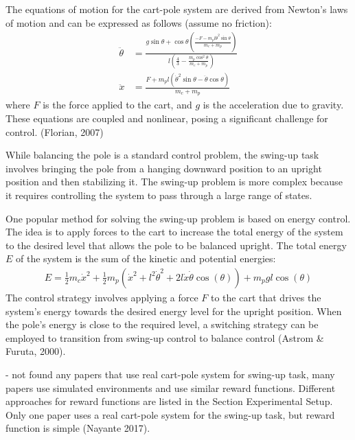The equations of motion for the cart-pole system are derived from Newton's laws of motion and can be expressed as follows (assume no friction):
\begin{align}
    \ddot{\theta} &= \frac{g\sin\theta + \cos\theta\left(\frac{-F-m_pl\dot{\theta}^2\sin\theta}{m_c+m_p}\right)}{l\left(\frac{4}{3}-\frac{m_p\cos^2\theta}{m_c+m_p}\right)} \\
    \ddot{x} &= \frac{F+m_pl(\dot{\theta}^2\sin\theta-\ddot{\theta}\cos\theta)}{m_c+m_p}
\end{align}
where $F$ is the force applied to the cart, and $g$ is the acceleration due to gravity. These equations are coupled and nonlinear, posing a significant challenge for control. (Florian, 2007)

While balancing the pole is a standard control problem, the swing-up task involves bringing the pole from a hanging downward position to an upright position and then stabilizing it. The swing-up problem is more complex because it requires controlling the system to pass through a large range of states.

One popular method for solving the swing-up problem is based on energy control. The idea is to apply forces to the cart to increase the total energy of the system to the desired level that allows the pole to be balanced upright. The total energy $E$ of the system is the sum of the kinetic and potential energies:
\begin{align}
    E = \frac{1}{2}m_c\dot{x}^2 + \frac{1}{2}m_p(\dot{x}^2 + l^2\dot{\theta}^2 + 2l\dot{x}\dot{\theta}\cos(\theta)) + m_pgl\cos(\theta)
\end{align}
The control strategy involves applying a force $F$ to the cart that drives the system's energy towards the desired energy level for the upright position. When the pole's energy is close to the required level, a switching strategy can be employed to transition from swing-up control to balance control (Astrom & Furuta, 2000).

- not found any papers that use real cart-pole system for swing-up task, many papers use simulated environments and use similar reward functions. Different approaches for reward functions are listed in the Section Experimental Setup. Only one paper uses a real cart-pole system for the swing-up task, but reward function is simple (Nayante 2017). %
